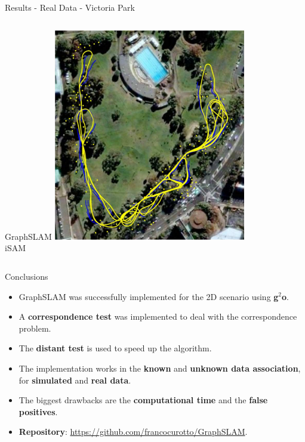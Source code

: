 \documentclass{beamer}
\begin{document}
\begin{frame}{Results - Real Data - Victoria Park}
\begin{center}
\begin{overprint}[\textwidth]
\begin{columns}
GraphSLAM
\centering
\includegraphics[width=0.63\textwidth, angle=-36]{img/victoria-isam.png}\\
iSAM
\end{columns}
\end{overprint}
\end{center}
\end{frame}

\begin{frame}{Conclusions}
\begin{itemize}
\setlength\itemsep{1.5em}
\item GraphSLAM was successfully implemented for the 2D scenario using \textbf{g$^2$o}.
\item A \textbf{correspondence test} was implemented to deal with the correspondence problem.
\item The \textbf{distant test} is used to speed up the algorithm.
\item The implementation works in the \textbf{known} and \textbf{unknown data association}, for \textbf{simulated} and \textbf{real data}.
\item The biggest drawbacks are the \textbf{computational time} and the \textbf{false positives}.
\item \textbf{Repository}: \url{https://github.com/francocurotto/GraphSLAM}.
\end{itemize}
\end{frame}
\end{document}
